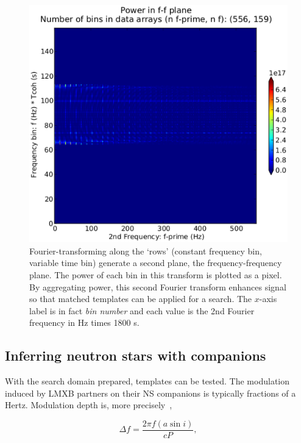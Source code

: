 \begin{figure}
\begin{center}
\includegraphics[trim=20 15 80 5, clip, width=0.7\paperwidth,height=0.35\paperheight]{ffplane-4e21-on-4e24.eps}
\caption{Fourier-transforming along the `rows' (constant frequency bin, variable time bin) generate a second plane, the frequency-frequency plane. The power of each bin in this transform is plotted as a pixel. By aggregating power, this second Fourier transform enhances signal so that matched templates can be applied for a search. The $x$-axis label is in fact \textit{bin number} and each value is the 2nd Fourier frequency in Hz times 1800 s.}
\label{ffplane-figure}
\end{center}
\end{figure}

            \subsection{Inferring neutron stars with companions}
            \label{inference}
 
With the search domain prepared, templates can be tested.
The modulation induced by LMXB partners on their NS companions is typically fractions of a Hertz.
Modulation depth is, more precisely~\cite{GoetzTwoSpectMethods2011},

\begin{equation}
\Delta f = \frac{2 \pi f (a \sin i)}{c P},
\label{TwoSpect_mod_depth}
\end{equation}

